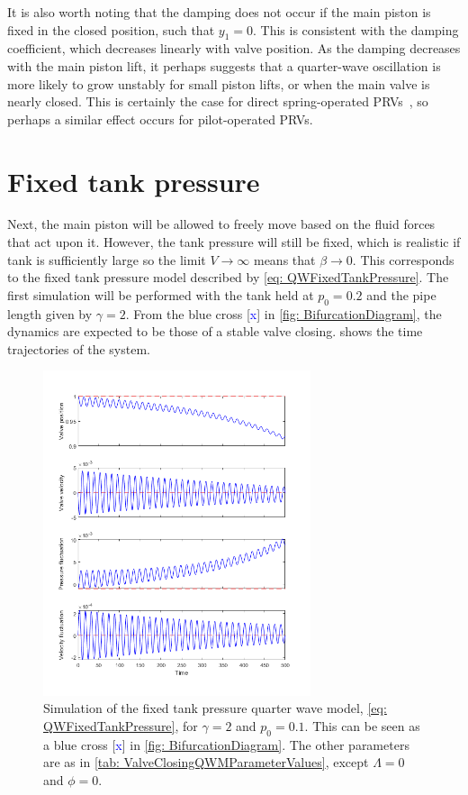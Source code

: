 It is also worth noting that the damping does not occur if the main piston is fixed in the closed position, such that $y_1 = 0$. This is consistent with the damping coefficient, which decreases linearly with valve position. As the damping decreases with the main piston lift, it perhaps suggests that a quarter-wave oscillation is more likely to grow unstably for small piston lifts, or when the main valve is nearly closed. This is certainly the case for direct spring-operated PRVs~\cite{Hos2017DynamicRecommendations}, so perhaps a similar effect occurs for pilot-operated PRVs.

\section{Fixed tank pressure}

Next, the main piston will be allowed to freely move based on the fluid forces that act upon it. However, the tank pressure will still be fixed, which is realistic if tank is sufficiently large so the limit $V \rightarrow \infty$ means that $\beta \rightarrow 0$. This corresponds to the fixed tank pressure model described by \cref{eq: QWFixedTankPressure}. The first simulation will be performed with the tank held at $p_0 = 0.2$ and the pipe length given by $\gamma = 2$. From the blue cross [\textcolor{Blue}{x}] in \cref{fig: BifurcationDiagram}, the dynamics are expected to be those of a stable valve closing.  shows the time trajectories of the system.
~
\begin{figure}[ht]
    \centering
    \includegraphics[width=0.7\textwidth]{Figures/CloseToHopf/HopfStable.png}
    \caption{Simulation of the fixed tank pressure quarter wave model, \cref{eq: QWFixedTankPressure}, for $\gamma = 2$ and $p_0 = 0.1$. This can be seen as a blue cross [\textcolor{Blue}{x}] in \cref{fig: BifurcationDiagram}. The other parameters are as in \cref{tab: ValveClosingQWMParameterValues}, except $\Lambda=0$ and $\phi=0$.}
    \label{fig: StableHopf}
\end{figure}

